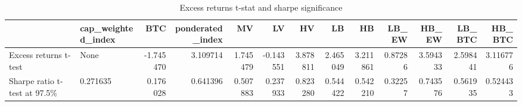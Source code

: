 \begin{table}
\centering
\caption{Excess returns t-stat and sharpe significance}
\label{signif20}
\begin{tabular}{llrrrrrrrrrrr}
\toprule
{} & cap\_weighted\_index &       BTC &  ponderated\_index &        MV &        LV &        HV &        LB &        HB &    LB\_EW &     HB\_EW &    LB\_BTC &    HB\_BTC \\
\midrule
Excess returns t-test        &               None & -1.745470 &          3.109714 &  1.745479 & -0.143551 &  3.878811 &  2.465049 &  3.211861 &  0.87286 &  3.594333 &  2.598441 &  3.116776 \\
Sharpe ratio t-test at 97.5\% &           0.271635 &  0.176028 &          0.641396 &  0.507883 &  0.237933 &  0.823280 &  0.544422 &  0.542210 &  0.32257 &  0.743576 &  0.561935 &  0.524433 \\
\bottomrule
\end{tabular}
\end{table}
